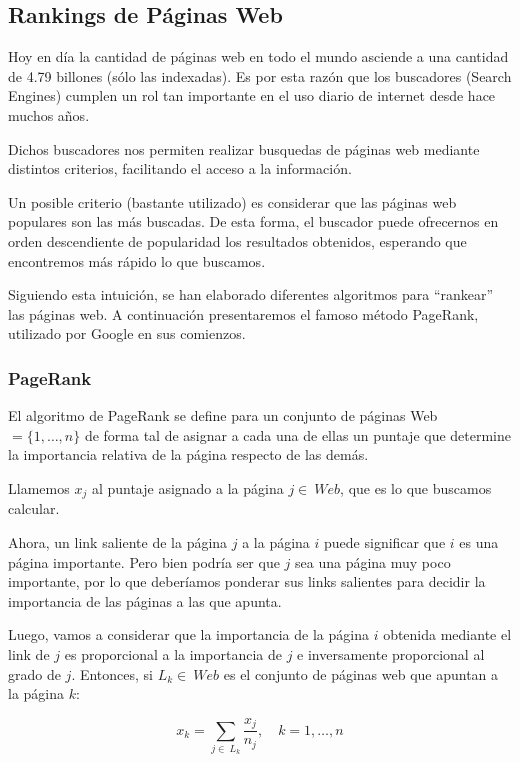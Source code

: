 \subsection{Rankings de Páginas Web}

Hoy en día la cantidad de páginas web en todo el mundo asciende a una cantidad de
4.79 billones (sólo las indexadas). Es por esta razón que los buscadores
(Search Engines) cumplen un rol tan importante en el uso diario de internet desde
hace muchos años.

Dichos buscadores nos permiten realizar busquedas de páginas web mediante distintos
criterios, facilitando el acceso a la información.

Un posible criterio (bastante utilizado) es considerar que las páginas web populares
son las más buscadas. De esta forma, el buscador puede ofrecernos en orden descendiente
de popularidad los resultados obtenidos, esperando que encontremos más rápido lo
 que buscamos.

 Siguiendo esta intuición, se han elaborado diferentes algoritmos para ``rankear''
 las páginas web. A continuación presentaremos el famoso método PageRank, utilizado
 por Google en sus comienzos.

\subsubsection{PageRank}\label{PageRank}

El algoritmo de PageRank\cite{Bryan2006} se define para un conjunto de
páginas Web $ = \{ 1,\dots, n \}$ de forma tal de asignar a cada una de ellas un
 puntaje que determine la importancia relativa de la página respecto de las demás.

Llamemos $x_j$ al puntaje asignado a la página $j\in\ Web$, que es lo que buscamos
calcular.

Ahora, un link saliente de la página $j$ a la página $i$ puede significar que $i$
 es una página importante. Pero bien podría ser que $j$ sea una página muy poco
 importante, por lo que deberíamos ponderar sus links salientes para decidir
 la importancia de las páginas a las que apunta.

Luego, vamos a considerar que la importancia de la página $i$ obtenida mediante el
link de $j$ es proporcional a la importancia de $j$ e inversamente proporcional
al grado de $j$. Entonces, si $L_k \in\ Web$ es el conjunto de páginas web que
apuntan a la página $k$:

\begin{equation} \label{eq:puntajes_page_rank}
    x_k = \sum\limits_{j \in\ L_k}{\frac{x_j}{n_j}},\quad k=1,\dots,n
\end{equation}

